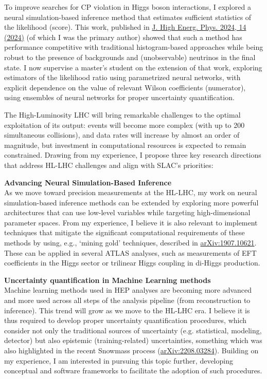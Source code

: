 \documentclass[11pt, a4paper]{awesome-cv}
\begin{document}
\begin{cvletter}
  To improve searches for CP violation in Higgs boson interactions, I explored a neural simulation-based inference method that estimates sufficient statistics of the likelihood (score). This work, published in \href{https://doi.org/10.1007/JHEP04(2024)014}{J. High Energ. Phys. 2024, 14 (2024)} (of which I was the primary author) showed that such a method has performance competitive with traditional histogram-based approaches while being robust to the presence of backgrounds and (unobservable) neutrinos in the final state. I now supervise a master's student on the extension of that work, exploring estimators of the likelihood ratio using parametrized neural networks, with explicit dependence on the value of relevant Wilson coefficients (numerator), using ensembles of neural networks for proper uncertainty quantification.
  
  
  The High-Luminosity LHC will bring remarkable challenges to the optimal exploitation of its output: events will become more complex (with up to 200 simultaneous collisions), and data rates will increase by almost an order of magnitude, but investment in computational resources is expected to remain constrained. Drawing from my experience, I propose three key research directions that address HL-LHC challenges and align with SLAC's priorities:
  
  \textbf{Advancing Neural Simulation-Based Inference}\\
  As we move toward precision measurements at the HL-LHC, my work on neural simulation-based inference methods can be extended by exploring more powerful architectures that can use low-level variables while targeting high-dimensional parameter spaces. From my experience, I believe it is also relevant to implement techniques that mitigate the significant computational requirements of these methods by using, e.g., `mining gold' techniques, described in \href{https://arxiv.org/abs/1907.10621}{arXiv:1907.10621}. These can be applied in several ATLAS analyses, such as measurements of EFT coefficients in the Higgs sector or trilinear Higgs coupling in di-Higgs production.
  
  \textbf{Uncertainty quantification in Machine Learning methods}\\
  Machine learning methods used in HEP analyses are becoming more advanced and more used across all steps of the analysis pipeline (from reconstruction to inference). This trend will grow as we move to the HL-LHC era. I believe it is thus required to develop proper uncertainty quantification procedures, which consider not only the traditional sources of uncertainty (e.g. statistical, modeling, detector) but also epistemic (training-related) uncertainties, something which was also highlighted in the recent Snowmass process (\href{https://arxiv.org/abs/2208.03284}{arXiv:2208.03284}). Building on my experience, I am interested in pursuing this topic further, developing conceptual and software frameworks to facilitate the adoption of such procedures.
  

\end{cvletter}
\end{document}
